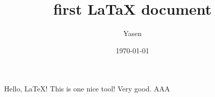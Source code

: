 \documentclass[]{article}	%
\title{first LaTaX document}
\author{Yasen}
\date{\today}
\begin{document}
	\maketitle
	Hello, LaTeX!
	This is one nice tool! Very good. AAA
\end{document}
